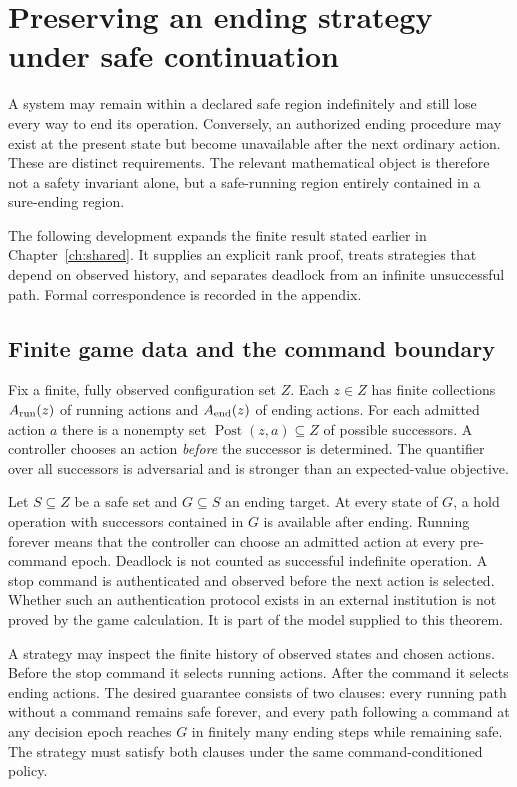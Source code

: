 \chapter{Preserving an ending strategy under safe continuation}\label{ch:endinganalysis}

A system may remain within a declared safe region indefinitely and still lose every way to end its operation. Conversely, an authorized ending procedure may exist at the present state but become unavailable after the next ordinary action. These are distinct requirements. The relevant mathematical object is therefore not a safety invariant alone, but a safe-running region entirely contained in a sure-ending region.

The following development expands the finite result stated earlier in Chapter~\ref{ch:shared}. It supplies an explicit rank proof, treats strategies that depend on observed history, and separates deadlock from an infinite unsuccessful path. Formal correspondence is recorded in the appendix.

\section{Finite game data and the command boundary}
Fix a finite, fully observed configuration set $Z$. Each $z\in Z$ has finite collections $A_{\rm run}(z)$ of running actions and $A_{\rm end}(z)$ of ending actions. For each admitted action $a$ there is a nonempty set $\operatorname{Post}(z,a)\subseteq Z$ of possible successors. A controller chooses an action \emph{before} the successor is determined. The quantifier over all successors is adversarial and is stronger than an expected-value objective.

Let $S\subseteq Z$ be a safe set and $G\subseteq S$ an ending target. At every state of $G$, a hold operation with successors contained in $G$ is available after ending. Running forever means that the controller can choose an admitted action at every pre-command epoch. Deadlock is not counted as successful indefinite operation. A stop command is authenticated and observed before the next action is selected. Whether such an authentication protocol exists in an external institution is not proved by the game calculation. It is part of the model supplied to this theorem.

A strategy may inspect the finite history of observed states and chosen actions. Before the stop command it selects running actions. After the command it selects ending actions. The desired guarantee consists of two clauses: every running path without a command remains safe forever, and every path following a command at any decision epoch reaches $G$ in finitely many ending steps while remaining safe. The strategy must satisfy both clauses under the same command-conditioned policy.

